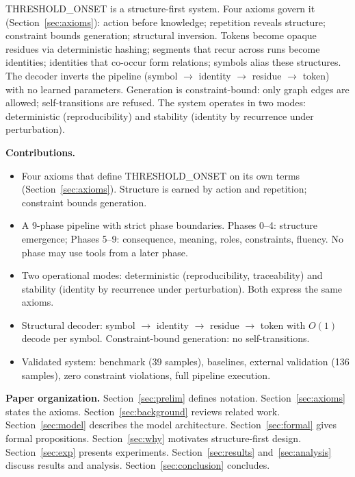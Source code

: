 \documentclass[10pt]{article}
\begin{document}
THRESHOLD\_ONSET is a structure-first system. Four axioms govern it (Section~\ref{sec:axioms}): action before knowledge; repetition reveals structure; constraint bounds generation; structural inversion. Tokens become opaque residues via deterministic hashing; segments that recur across runs become identities; identities that co-occur form relations; symbols alias these structures. The decoder inverts the pipeline (symbol $\rightarrow$ identity $\rightarrow$ residue $\rightarrow$ token) with no learned parameters. Generation is constraint-bound: only graph edges are allowed; self-transitions are refused. The system operates in two modes: deterministic (reproducibility) and stability (identity by recurrence under perturbation).

\textbf{Contributions.}
\begin{itemize}
  \item Four axioms that define THRESHOLD\_ONSET on its own terms (Section~\ref{sec:axioms}). Structure is earned by action and repetition; constraint bounds generation.
  \item A 9-phase pipeline with strict phase boundaries. Phases 0--4: structure emergence; Phases 5--9: consequence, meaning, roles, constraints, fluency. No phase may use tools from a later phase.
  \item Two operational modes: deterministic (reproducibility, traceability) and stability (identity by recurrence under perturbation). Both express the same axioms.
  \item Structural decoder: symbol $\rightarrow$ identity $\rightarrow$ residue $\rightarrow$ token with $O(1)$ decode per symbol. Constraint-bound generation: no self-transitions.
  \item Validated system: benchmark (39 samples), baselines, external validation (136 samples), zero constraint violations, full pipeline execution.
\end{itemize}

\textbf{Paper organization.}
Section~\ref{sec:prelim} defines notation. Section~\ref{sec:axioms} states the axioms. Section~\ref{sec:background} reviews related work. Section~\ref{sec:model} describes the model architecture. Section~\ref{sec:formal} gives formal propositions. Section~\ref{sec:why} motivates structure-first design. Section~\ref{sec:exp} presents experiments. Section~\ref{sec:results} and~\ref{sec:analysis} discuss results and analysis. Section~\ref{sec:conclusion} concludes.

\end{document}

